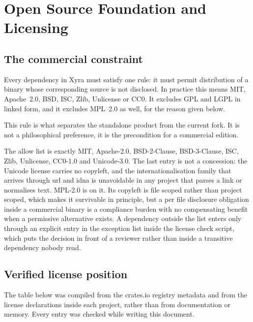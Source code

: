 \chapter{Open Source Foundation and Licensing}
\label{ch:foundation}

\section{The commercial constraint}

Every dependency in Xyra must satisfy one rule: it must permit distribution of a binary
whose corresponding source is not disclosed. In practice this means MIT, Apache~2.0, BSD,
ISC, Zlib, Unlicense or CC0. It excludes GPL and LGPL in linked form, and it excludes MPL~2.0
as well, for the reason given below.

This rule is what separates the standalone product from the current fork. It is not a
philosophical preference, it is the precondition for a commercial edition.

The allow list is exactly MIT, Apache-2.0, BSD-2-Clause, BSD-3-Clause, ISC, Zlib, Unlicense,
CC0-1.0 and Unicode-3.0. The last entry is not a concession: the Unicode license carries no
copyleft, and the internationalisation family that arrives through url and idna is
unavoidable in any project that parses a link or normalises text. MPL-2.0 is  on it. Its copyleft is file scoped rather than project
scoped, which makes it survivable in principle, but a per file disclosure obligation inside a
commercial binary is a compliance burden with no compensating benefit when a permissive
alternative exists. A dependency outside the list enters only through an explicit entry in the
exception list inside the license check script, which puts the decision in front of a reviewer
rather than inside a transitive dependency nobody read.

\section{Verified license position}

The table below was compiled from the crates.io registry metadata and from the license
declarations inside each project, rather than from documentation or memory. Every entry was
checked while writing this document.

